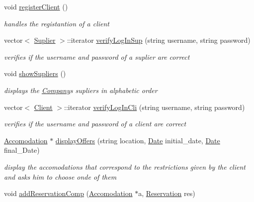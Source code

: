 \begin{DoxyCompactItemize}
\hypertarget{class_company_a402904c6651146a9ca6023e72bd6c8fc}{}\label{class_company_a402904c6651146a9ca6023e72bd6c8fc} 
void \hyperlink{class_company_a402904c6651146a9ca6023e72bd6c8fc}{register\+Client} ()
\begin{DoxyCompactList}\small\item\em handles the registantion of a client \end{DoxyCompactList}\item 
vector$<$ \hyperlink{class_suplier}{Suplier} $>$\+::iterator \hyperlink{class_company_a9012e0fa84141868a482a0a69b6313af}{verify\+Log\+In\+Sup} (string username, string password)
\begin{DoxyCompactList}\small\item\em verifies if the username and password of a suplier are correct \end{DoxyCompactList}\item 
\hypertarget{class_company_af28086a1cdedb27e3cf33793cf9247af}{}\label{class_company_af28086a1cdedb27e3cf33793cf9247af} 
void \hyperlink{class_company_af28086a1cdedb27e3cf33793cf9247af}{show\+Supliers} ()
\begin{DoxyCompactList}\small\item\em displays the \hyperlink{class_company}{Company}\textquotesingle{}s supliers in alphabetic order \end{DoxyCompactList}\item 
vector$<$ \hyperlink{class_client}{Client} $>$\+::iterator \hyperlink{class_company_ae09dab4c6a0d26207cdeffd0d5adcf8f}{verify\+Log\+In\+Cli} (string username, string password)
\begin{DoxyCompactList}\small\item\em verifies if the username and password of a client are correct \end{DoxyCompactList}\item 
\hyperlink{class_accomodation}{Accomodation} $\ast$ \hyperlink{class_company_a2b6d438df8e871898eef5fc5e3e8f761}{display\+Offers} (string location, \hyperlink{class_date}{Date} initial\+\_\+date, \hyperlink{class_date}{Date} final\+\_\+\+Date)
\begin{DoxyCompactList}\small\item\em display the accomodations that correspond to the restrictions given by the client and asks him to choose onde of them \end{DoxyCompactList}\item 
void \hyperlink{class_company_a926f92ef72febeda6dd310becdd71f3a}{add\+Reservation\+Comp} (\hyperlink{class_accomodation}{Accomodation} $\ast$a, \hyperlink{class_reservation}{Reservation} res)

\end{DoxyCompactItemize}
